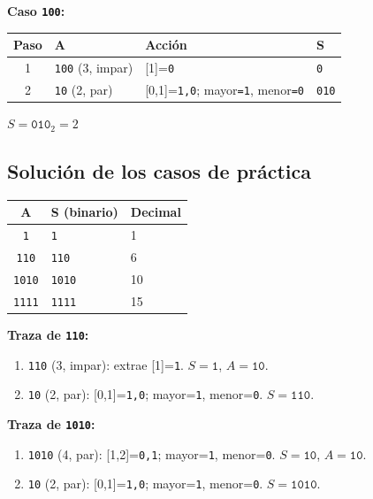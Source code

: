 \documentclass[12pt, oneside]{article}
\begin{document}
\textbf{Caso \texttt{100}:}

\begin{center}
\begin{tabular}{clll}
  \toprule
  Paso & A & Acción & S \\
  \midrule
  1 & \texttt{100} (3, impar) & [1]=\texttt{0} & \texttt{0} \\
  2 & \texttt{10}  (2, par)   & [0,1]=\texttt{1,0}; mayor\texttt{=1}, menor\texttt{=0} & \texttt{010} \\
  \bottomrule
\end{tabular}
\end{center}
$S=\texttt{010}_2=2$ \checkmark

\subsection{Solución de los casos de práctica}

\begin{center}
\begin{tabular}{cll}
  \toprule
  A & S (binario) & Decimal \\
  \midrule
  \texttt{1}    & \texttt{1}    & 1 \\
  \texttt{110}  & \texttt{110}  & 6 \\
  \texttt{1010} & \texttt{1010} & 10 \\
  \texttt{1111} & \texttt{1111} & 15 \\
  \bottomrule
\end{tabular}
\end{center}

\textbf{Traza de \texttt{110}:}
\begin{enumerate}
  \item \texttt{110} (3, impar): extrae [1]=\texttt{1}. $S=\texttt{1}$, $A=\texttt{10}$.
  \item \texttt{10} (2, par): [0,1]=\texttt{1,0}; mayor=\texttt{1}, menor=\texttt{0}. $S=\texttt{110}$.
\end{enumerate}

\textbf{Traza de \texttt{1010}:}
\begin{enumerate}
  \item \texttt{1010} (4, par): [1,2]=\texttt{0,1}; mayor=\texttt{1}, menor=\texttt{0}. $S=\texttt{10}$, $A=\texttt{10}$.
  \item \texttt{10} (2, par): [0,1]=\texttt{1,0}; mayor=\texttt{1}, menor=\texttt{0}. $S=\texttt{1010}$.
\end{enumerate}
\end{document}
